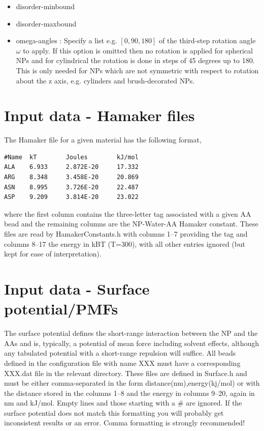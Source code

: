 \documentclass[10pt,a4paper,onecolumn]{report}
\begin{document}
\begin{itemize}
\item disorder-minbound
\item disorder-maxbound
\item omega-angles : Specify a list e.g.  $[0, 90, 180]$ of the third-step rotation angle $\omega$ to apply. If this option is omitted then no rotation is applied for spherical NPs and for cylindrical the rotation is done in steps of 45 degrees up to 180. This is only needed for NPs which are not symmetric with respect to rotation about the z axis, e.g. cylinders and brush-decorated NPs.
\end{itemize}


\section{Input data - Hamaker files}
The Hamaker file for a given material has the following format,
\begin{lstlisting}
#Name  kT        Joules        kJ/mol    
ALA    6.933     2.872E-20     17.332    
ARG    8.348     3.458E-20     20.869    
ASN    8.995     3.726E-20     22.487    
ASP    9.209     3.814E-20     23.022    
\end{lstlisting}
where the first column contains the three-letter tag associated with a given AA bead and the remaining columns are the NP-Water-AA Hamaker constant. These files are read by HamakerConstants.h with columns 1--7 providing the tag and columns 8--17 the energy in kBT (T=300), with all other entries ignored (but kept for ease of interpretation).


\section{Input data - Surface potential/PMFs}
The surface potential defines the short-range interaction between the NP and the AAs and is, typically, a potential of mean force including solvent effects, although any tabulated potential with a short-range repulsion will suffice. All beads defined in the configuration file with name XXX must have a corresponding XXX.dat file in the relevant directory. These files are defined in Surface.h and must be either comma-separated in the form distance(nm),energy(kj/mol) or with the distance stored in the columns 1--8 and the energy in columns 9--20, again in nm and kJ/mol. Empty lines and those starting with a \# are ignored. If the surface potential does not match this formatting you will probably get inconsistent results or an error. Comma formatting is strongly recommended! 
\end{document}
